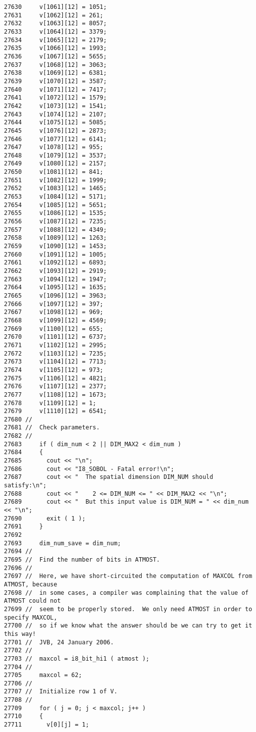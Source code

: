 \begin{Code}
\begin{verbatim}
27630     v[1061][12] = 1051;
27631     v[1062][12] = 261;
27632     v[1063][12] = 8057;
27633     v[1064][12] = 3379;
27634     v[1065][12] = 2179;
27635     v[1066][12] = 1993;
27636     v[1067][12] = 5655;
27637     v[1068][12] = 3063;
27638     v[1069][12] = 6381;
27639     v[1070][12] = 3587;
27640     v[1071][12] = 7417;
27641     v[1072][12] = 1579;
27642     v[1073][12] = 1541;
27643     v[1074][12] = 2107;
27644     v[1075][12] = 5085;
27645     v[1076][12] = 2873;
27646     v[1077][12] = 6141;
27647     v[1078][12] = 955;
27648     v[1079][12] = 3537;
27649     v[1080][12] = 2157;
27650     v[1081][12] = 841;
27651     v[1082][12] = 1999;
27652     v[1083][12] = 1465;
27653     v[1084][12] = 5171;
27654     v[1085][12] = 5651;
27655     v[1086][12] = 1535;
27656     v[1087][12] = 7235;
27657     v[1088][12] = 4349;
27658     v[1089][12] = 1263;
27659     v[1090][12] = 1453;
27660     v[1091][12] = 1005;
27661     v[1092][12] = 6893;
27662     v[1093][12] = 2919;
27663     v[1094][12] = 1947;
27664     v[1095][12] = 1635;
27665     v[1096][12] = 3963;
27666     v[1097][12] = 397;
27667     v[1098][12] = 969;
27668     v[1099][12] = 4569;
27669     v[1100][12] = 655;
27670     v[1101][12] = 6737;
27671     v[1102][12] = 2995;
27672     v[1103][12] = 7235;
27673     v[1104][12] = 7713;
27674     v[1105][12] = 973;
27675     v[1106][12] = 4821;
27676     v[1107][12] = 2377;
27677     v[1108][12] = 1673;
27678     v[1109][12] = 1;
27679     v[1110][12] = 6541;
27680 //
27681 //  Check parameters.
27682 //
27683     if ( dim_num < 2 || DIM_MAX2 < dim_num )
27684     {
27685       cout << "\n";
27686       cout << "I8_SOBOL - Fatal error!\n";
27687       cout << "  The spatial dimension DIM_NUM should satisfy:\n";
27688       cout << "    2 <= DIM_NUM <= " << DIM_MAX2 << "\n";
27689       cout << "  But this input value is DIM_NUM = " << dim_num << "\n";
27690       exit ( 1 );
27691     }
27692 
27693     dim_num_save = dim_num;
27694 //
27695 //  Find the number of bits in ATMOST.
27696 //
27697 //  Here, we have short-circuited the computation of MAXCOL from ATMOST, because
27698 //  in some cases, a compiler was complaining that the value of ATMOST could not
27699 //  seem to be properly stored.  We only need ATMOST in order to specify MAXCOL,
27700 //  so if we know what the answer should be we can try to get it this way!
27701 //  JVB, 24 January 2006.
27702 //
27703 //  maxcol = i8_bit_hi1 ( atmost );
27704 //
27705     maxcol = 62;
27706 //
27707 //  Initialize row 1 of V.
27708 //
27709     for ( j = 0; j < maxcol; j++ )
27710     {
27711       v[0][j] = 1;

\end{verbatim}
\end{Code}
